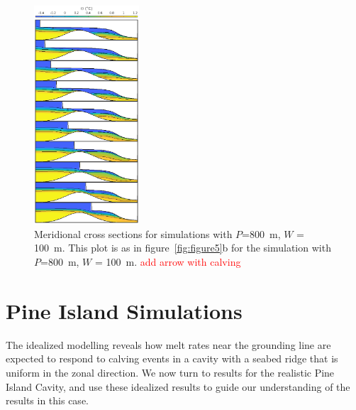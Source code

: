 \documentclass[draft]{agujournal2019}
\newcommand{\red}[1]{\textcolor{red}{#1}}
\begin{document}
\begin{figure}
    \centering
    \includegraphics[width = 0.35\textwidth]{../make_figures/plots/figure9.eps}
    \caption{Meridional cross sections for simulations with $P$=800~m, $W$ = 100~m. This plot is as in figure~\ref{fig:figure5}b for the simulation with $P$=800~m, $W$ = 100~m.  \red{add arrow with calving} }
    \label{fig:figure9}
\end{figure}


\section{Pine Island Simulations}
The idealized modelling reveals how melt rates near the grounding line are expected to respond to calving events in a cavity with a seabed ridge that is uniform in the zonal direction. We now turn to results for the realistic Pine Island Cavity, and use these idealized results to guide our understanding of the results in this case. 
\end{document}
